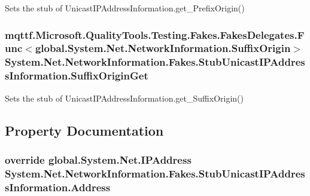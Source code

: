 Sets the stub of Unicast\-I\-P\-Address\-Information.\-get\-\_\-\-Prefix\-Origin()

\hypertarget{class_system_1_1_net_1_1_network_information_1_1_fakes_1_1_stub_unicast_i_p_address_information_ad499dadf3966078bbb62812c79cc1219}{
\subsubsection[{Suffix\-Origin\-Get}]{\setlength{\rightskip}{0pt plus 5cm}mqttf.\-Microsoft.\-Quality\-Tools.\-Testing.\-Fakes.\-Fakes\-Delegates.\-Func$<$global.\-System.\-Net.\-Network\-Information.\-Suffix\-Origin$>$ System.\-Net.\-Network\-Information.\-Fakes.\-Stub\-Unicast\-I\-P\-Address\-Information.\-Suffix\-Origin\-Get}}\label{class_system_1_1_net_1_1_network_information_1_1_fakes_1_1_stub_unicast_i_p_address_information_ad499dadf3966078bbb62812c79cc1219}


Sets the stub of Unicast\-I\-P\-Address\-Information.\-get\-\_\-\-Suffix\-Origin()



\subsection{Property Documentation}
\hypertarget{class_system_1_1_net_1_1_network_information_1_1_fakes_1_1_stub_unicast_i_p_address_information_ad5cc85ee7220de8f38f94735a966a5c7}{
\subsubsection[{Address}]{\setlength{\rightskip}{0pt plus 5cm}override global.\-System.\-Net.\-I\-P\-Address System.\-Net.\-Network\-Information.\-Fakes.\-Stub\-Unicast\-I\-P\-Address\-Information.\-Address\hspace{0.3cm}{\ttfamily [get]}}}\label{class_system_1_1_net_1_1_network_information_1_1_fakes_1_1_stub_unicast_i_p_address_information_ad5cc85ee7220de8f38f94735a966a5c7}


